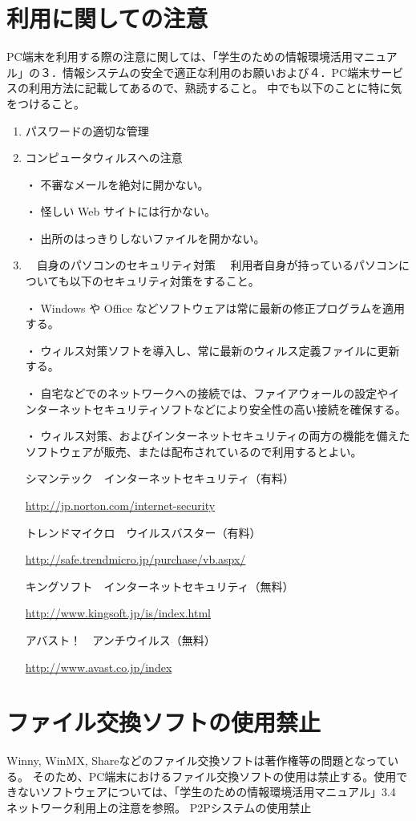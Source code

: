 \section{利用に関しての注意}
PC端末を利用する際の注意に関しては、「学生のための情報環境活用マニュアル」の３．情報システムの安全で適正な利用のお願いおよび４．PC端末サービスの利用方法に記載してあるので、熟読すること。
中でも以下のことに特に気をつけること。
\begin{enumerate}
\item パスワードの適切な管理

\item コンピュータウィルスへの注意

・ 不審なメールを絶対に開かない。

・ 怪しい Web サイトには行かない。

・ 出所のはっきりしないファイルを開かない。

\item 　自身のパソコンのセキュリティ対策
　利用者自身が持っているパソコンについても以下のセキュリティ対策をすること。

・ Windows や Office などソフトウェアは常に最新の修正プログラムを適用する。

・ ウィルス対策ソフトを導入し、常に最新のウィルス定義ファイルに更新する。

・ 自宅などでのネットワークへの接続では、ファイアウォールの設定やインターネットセキュリティソフトなどにより安全性の高い接続を確保する。

・ ウィルス対策、およびインターネットセキュリティの両方の機能を備えたソフトウェアが販売、または配布されているので利用するとよい。

シマンテック　インターネットセキュリティ（有料）

\url{http://jp.norton.com/internet-security}

トレンドマイクロ　ウイルスバスター（有料）

\url{http://safe.trendmicro.jp/purchase/vb.aspx/}

キングソフト　インターネットセキュリティ（無料）

\url{http://www.kingsoft.jp/is/index.html}

アバスト！　アンチウイルス（無料）

\url{http://www.avast.co.jp/index}
\end{enumerate}

\section{ファイル交換ソフトの使用禁止}
Winny, WinMX, Shareなどのファイル交換ソフトは著作権等の問題となっている。
そのため、PC端末におけるファイル交換ソフトの使用は禁止する。使用できないソフトウェアについては、「学生のための情報環境活用マニュアル」3.4 ネットワーク利用上の注意を参照。
P2Pシステムの使用禁止

